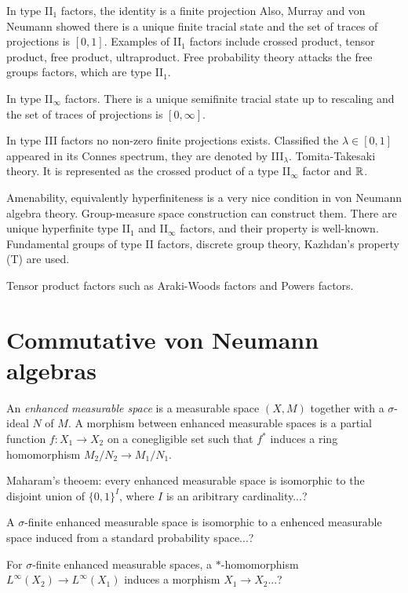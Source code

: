 \documentclass{../../large}
\begin{document}
In type II$_1$ factors, the identity is a finite projection
Also, Murray and von Neumann showed there is a unique finite tracial state and the set of traces of projections is $[0,1]$.
Examples of II$_1$ factors include crossed product, tensor product, free product, ultraproduct.
Free probability theory attacks the free groups factors, which are type II$_1$.

In type II$_\infty$ factors.
There is a unique semifinite tracial state up to rescaling and the set of traces of projections is $[0,\infty]$.

In type III factors no non-zero finite projections exists.
Classified the $\lambda\in[0,1]$ appeared in its Connes spectrum, they are denoted by III$_\lambda$.
Tomita-Takesaki theory.
It is represented as the crossed product of a type II$_\infty$ factor and $\mathbb{R}$.

Amenability, equivalently hyperfiniteness is a very nice condition in von Neumann algebra theory.
Group-measure space construction can construct them.
There are unique hyperfinite type II$_1$ and II$_\infty$ factors, and their property is well-known.
Fundamental groups of type II factors, discrete group theory, Kazhdan's property (T) are used.

Tensor product factors such as Araki-Woods factors and Powers factors.





\section{Commutative von Neumann algebras}

\begin{prb}
An \emph{enhanced measurable space} is a measurable space $(X,M)$ together with a $\sigma$-ideal $N$ of $M$.
A morphism between enhanced measurable spaces is a partial function $f:X_1\to X_2$ on a conegligible set such that $f^*$ induces a ring homomorphism $M_2/N_2\to M_1/N_1$.
\begin{parts}
\item Maharam's theoem: every enhanced measurable space is isomorphic to the disjoint union of $\{0,1\}^I$, where $I$ is an aribitrary cardinality...?
\item A $\sigma$-finite enhanced measurable space is isomorphic to a enhenced measurable space induced from a standard probability space...?
\item For $\sigma$-finite enhanced measurable spaces, a $*$-homomorphism $L^\infty(X_2)\to L^\infty(X_1)$ induces a morphism $X_1\to X_2$...?
\end{parts}
\end{prb}
\end{document}
